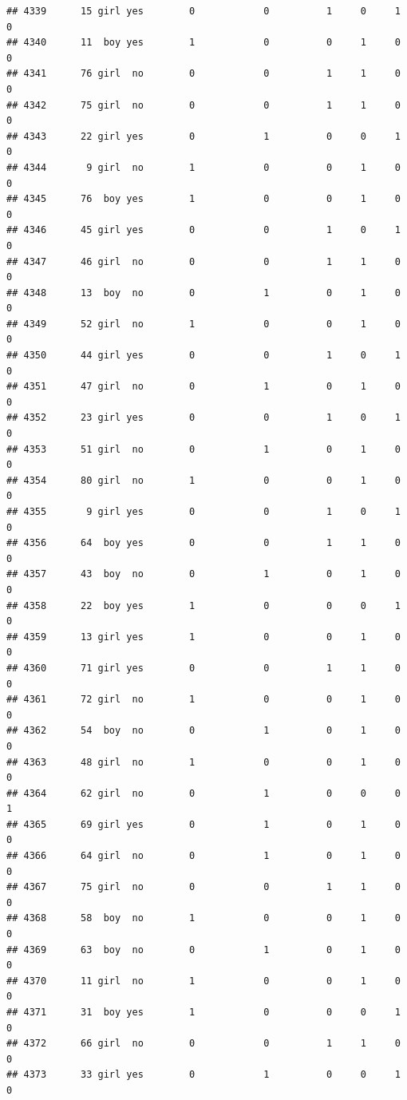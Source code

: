\documentclass[man]{apa6}
\begin{document}
\begin{verbatim}
## 4339      15 girl yes        0            0          1     0     1     0
## 4340      11  boy yes        1            0          0     1     0     0
## 4341      76 girl  no        0            0          1     1     0     0
## 4342      75 girl  no        0            0          1     1     0     0
## 4343      22 girl yes        0            1          0     0     1     0
## 4344       9 girl  no        1            0          0     1     0     0
## 4345      76  boy yes        1            0          0     1     0     0
## 4346      45 girl yes        0            0          1     0     1     0
## 4347      46 girl  no        0            0          1     1     0     0
## 4348      13  boy  no        0            1          0     1     0     0
## 4349      52 girl  no        1            0          0     1     0     0
## 4350      44 girl yes        0            0          1     0     1     0
## 4351      47 girl  no        0            1          0     1     0     0
## 4352      23 girl yes        0            0          1     0     1     0
## 4353      51 girl  no        0            1          0     1     0     0
## 4354      80 girl  no        1            0          0     1     0     0
## 4355       9 girl yes        0            0          1     0     1     0
## 4356      64  boy yes        0            0          1     1     0     0
## 4357      43  boy  no        0            1          0     1     0     0
## 4358      22  boy yes        1            0          0     0     1     0
## 4359      13 girl yes        1            0          0     1     0     0
## 4360      71 girl yes        0            0          1     1     0     0
## 4361      72 girl  no        1            0          0     1     0     0
## 4362      54  boy  no        0            1          0     1     0     0
## 4363      48 girl  no        1            0          0     1     0     0
## 4364      62 girl  no        0            1          0     0     0     1
## 4365      69 girl yes        0            1          0     1     0     0
## 4366      64 girl  no        0            1          0     1     0     0
## 4367      75 girl  no        0            0          1     1     0     0
## 4368      58  boy  no        1            0          0     1     0     0
## 4369      63  boy  no        0            1          0     1     0     0
## 4370      11 girl  no        1            0          0     1     0     0
## 4371      31  boy yes        1            0          0     0     1     0
## 4372      66 girl  no        0            0          1     1     0     0
## 4373      33 girl yes        0            1          0     0     1     0

\end{verbatim}
\end{document}
